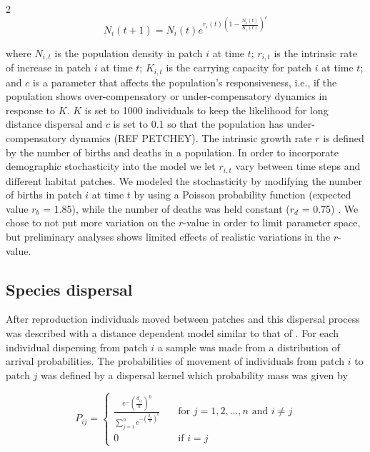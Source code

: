 \documentclass[12pt,pdftex]{article}
\begin{document}
\begin{spacing}{2}
\begin{equation}
N_{i}(t+1)= N_{i}(t)    e^{r_{i}(t)(1-\frac{N_{i}(t)}{K_{i}(t)})^c}	
\end{equation}	

where $N_{i,t}$ is the population density in patch $i$ at time $t$; $r_{i,t}$ is the intrinsic rate of increase in patch $i$ at time $t$; $K_{i,t}$ is the carrying capacity for patch $i$ at time $t$; and $c$ is a parameter that affects the population's responsiveness, i.e., if the population shows over-compensatory or under-compensatory dynamics in response to $K$.  $K$  is set to 1000 individuals to keep the likelihood for long distance dispersal and $c$ is set to 0.1 so that the population has under-compensatory dynamics (REF PETCHEY). The intrinsic growth rate $r$ is defined by the number of births and deaths in a population. In order to incorporate demographic stochasticity into the model we let $r_{i,t}$ vary between time steps and different habitat patches. We modeled the stochasticity by modifying the number of births in patch $i$ at time $t$ by using a Poisson probability function (expected value $r_{b}$ = 1.85),  while the number of deaths was held constant  ($r_{d}$ = 0.75) \citep{Melbourne2008}. We chose to not put more variation on the $r$-value in order to limit parameter space, but preliminary analyses shows limited effects of realistic variations in the $r$-value. 

\subsection*{Species dispersal}
After reproduction individuals moved between patches and this dispersal process was described with a distance dependent model similar to that of \cite{Lindstrom2009}. For each individual dispersing from patch $i$ a sample was made from a distribution of arrival probabilities. The probabilities of movement of individuals from patch $i$ to patch $j$ was defined by a dispersal kernel which probability mass was given by



\begin{equation}
	P_{ij}=  
	\begin{cases} 
		\frac{e^-(\frac{d_{ij}}{a})^b}{\sum_{j=1}^{n}e^{-(\frac{d_{ij}}{a})^b}}   
				& \quad \text{for } j = 1,2,...,n \text{ and } i\neq j  \\    
		0 & \quad \text{if } i=j
	\end{cases}
\end{equation}



\end{spacing}
\end{document}
